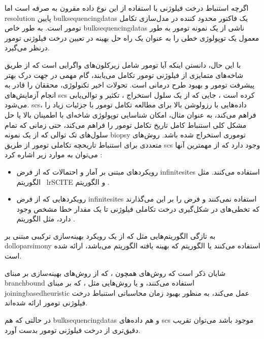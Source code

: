  اگرچه استنباط درخت فیلوژنی با استفاده از این نوع داده مقرون به صرفه است اما \gls{resolution} پایین \glspl{bulksequencingdata} یک فاکتور محدود کننده در مدل‌سازی تکامل تومور است. به طور خاص \glspl{bulksequencingdata} ناشی از یک نمونه تومور به طور معمول یک توپولوژی خطی را به عنوان یک راه حل بهینه در تعیین درخت فیلوژنی تومور درنظر می‌گیرد. \cite{donmez2016clonality}
 
 
 با این حال، دانستن اینکه آیا تومور شامل زیرکلون‌های واگرایی است که از طریق شاخه‌های متمایزی از فیلوژنی تومور تکامل می‌یابند، گام مهمی در جهت درک بهتر پیشرفت تومور و بهبود طرح درمانی است. تحولات اخیر تکنولوژی، محققان را قادر به انجام آزمایش‌های \gls{scs} کرده است ، جایی که  از یک سلول استخراج ، تکثیر و توالی‌یابی می‌شود. \gls{scs}، داده‌هایی با رزولوشن بالا برای مطالعه تکامل تومور با جزئیات زیاد را فراهم می‌کند، به عنوان مثال، امکان شناسایی توپولوژی شاخه‌ای با اطمینان بالا یا حل مشکل کلی استنباط کامل تاریخ تکامل تومور را فراهم می‌کند، حتی زمانی که تمام سلول‌های تک توالی که از یک نمونه \gls{biopsy} توموری استخراج شده باشد. روش‌های متعددی برای استنباط تاریحچه تکاملی تومور  از طریق  \gls{scs} وجود دارد که از مهمترین آنها می‌توان به موارد زیر اشاره کرد :  
 
 \begin{itemize}
 	\item رویکردهای مبتنی بر آمار و احتمالات که از فرض \gls{infinitesites}  استفاده می‌کنند. مثل الگوریتم \ lr{SCITE}  \cite{jahn2016tree} و الگوریتم   \cite{ross2016onconem}. 
\item رویکردهایی که از فرض \gls{infinitesites} استفاده نمی‌کنند و فرض را بر این می‌گذارند که تخطی‌های در شکل‌گیری درخت تکاملی فیلوژنی تا یک مقدار خطا مشخص وجود دارد، مثل الگوریتم  \cite{zafar2017sifit}.  
 \end{itemize}


به تازگی الگوریتم‌هایی مثل  که از یک رویکرد بهینه‌سازی ترکیبی مبتنی بر \gls{dolloparsimony} استفاده می‌کنند یا الگوریتم   که بهینه یافته الگوریتم  می‌باشد، ارائه شده است. \cite{el2018sphyr, zafar2019siclonefit}

شایان ذکر است که روش‌های همچون  ، که از روش‌های بهینه‌سازی بر مبنای \gls{branchbound} استفاده می‌کنند، و یا روش‌هایی مثل ، که بر مبنای \gls{joiningbasedheuristic} عمل می‌کند، به منظور بهبود زمان محاسباتی استنباط درخت فیلوژنی تومور ارائه شده‌اند. \cite{sadeqi2020phiscs, wu2020accurate}

در حالتی که هم \glspl{bulksequencingdata} و هم داده‌های \gls{scs} موجود باشد می‌توان تقریب دقیق‌تری از درخت فیلوژنی  تومور بدست آورد. \cite{malikic2019integrative, malikic2019phiscs}

